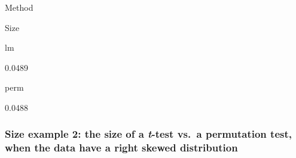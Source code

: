 \documentclass[]{book}
\begin{document}
Method

Size

lm

0.0489

perm

0.0488

\hypertarget{size-example-2-the-size-of-a-t-test-vs.-a-permutation-test-when-the-data-have-a-right-skewed-distribution}{%
\subsubsection{\texorpdfstring{Size example 2: the size of a \emph{t}-test vs.~a permutation test, when the data have a right skewed distribution}{Size example 2: the size of a t-test vs.~a permutation test, when the data have a right skewed distribution}}\label{size-example-2-the-size-of-a-t-test-vs.-a-permutation-test-when-the-data-have-a-right-skewed-distribution}}
\end{document}
